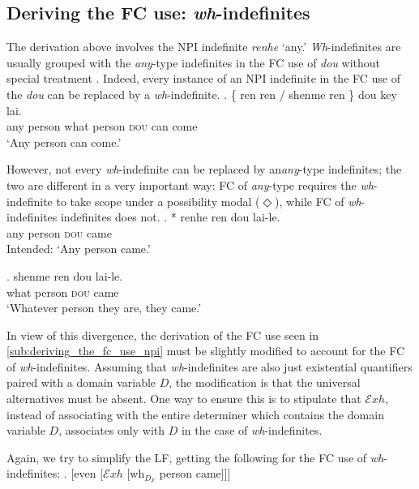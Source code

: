 \documentclass[12pt]{article}
\newcommand{\Exh}{\ensuremath{\mathcal{E}\mathit{xh}}}
\begin{document}
\subsection{Deriving the FC use: \emph{wh}-indefinites}
\label{sub:wh_indefinites}

The derivation above involves the NPI indefinite \emph{renhe} `any.'
\emph{Wh}-indefinites are usually grouped with the \emph{any}-type indefinites in the FC use of \emph{dou} without special treatment \citep{xiangFunctionAlternationsMandarin2020}.
Indeed, every instance of an NPI indefinite in the FC use of the \emph{dou} can be replaced by a \emph{wh}-indefinite.
\ex. \gll \{ ren ren / shenme ren \} dou key lai.\\
{} any person {} what person {} \textsc{dou} can come\\
\glt `Any person can come.'

However, not every \emph{wh}-indefinite can be replaced by an\emph{any}-type indefinites; the two are different in a very important way: FC of \emph{any}-type requires the \emph{wh}-indefinite to take scope under a possibility modal (\(\Diamond\)), while FC of \emph{wh}-indefinites indefinites does not.
\ex. *\gll 
renhe ren dou lai-le. \\
any person \textsc{dou} came \\
\glt Intended: `Any person came.'

\ex. \gll 
shenme ren dou lai-le. \\
what person \textsc{dou} came \\
\glt `Whatever person they are, they came.'

In view of this divergence, the derivation of the FC use seen in \cref{sub:deriving_the_fc_use_npi} must be slightly modified to account for the FC of \emph{wh}-indefinites.
Assuming that \emph{wh}-indefinites are also just existential quantifiers paired with a domain variable \(D\), the modification is that the universal alternatives must be absent.
One way to ensure this is to stipulate that {\Exh}, instead of associating with the entire determiner which contains the domain variable \(D\), associates only with \(D\) in the case of \emph{wh}-indefinites.

Again, we try to simplify the LF, getting the following for the FC use of \emph{wh}-indefinites:
\ex. [even [{\Exh} [wh\(_{D_F}\) person came]]] \label{itm:wh-prej}
\end{document}
